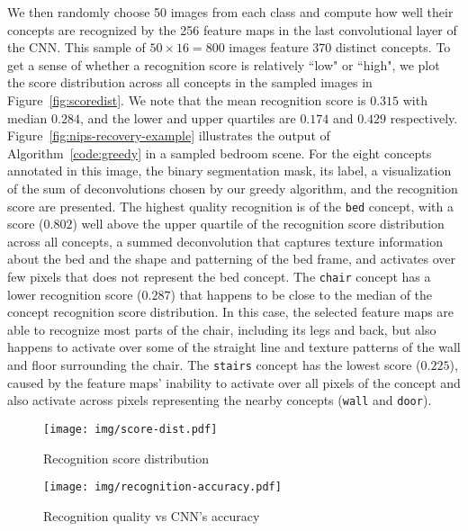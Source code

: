 \documentclass{article}
\begin{document}
We then randomly choose 50 images from each class and compute how well their concepts are recognized by the 256 feature maps in the last convolutional layer of the CNN.
This sample of $50\times16 = 800$ images feature 370 distinct concepts. 
To get a sense of whether a recognition score is relatively ``low" or ``high", we plot the score distribution across all concepts in the sampled images in Figure~\ref{fig:scoredist}. We note that the 
mean recognition score is $0.315$ with median $0.284$, and
the lower and upper quartiles are $0.174$ and $0.429$ respectively. 
Figure~\ref{fig:nips-recovery-example} illustrates the output of Algorithm~\ref{code:greedy} in a 
sampled bedroom scene. For the eight concepts annotated in this image, the binary segmentation
mask, its label, a visualization of the sum of deconvolutions chosen by our greedy algorithm, 
and the recognition score are presented. The highest quality recognition is of the \texttt{bed}
concept, with a score ($0.802$) well above the upper quartile of the recognition score distribution 
across all concepts, a summed deconvolution that captures texture information 
about the bed and the shape and patterning of the bed frame, and activates over few pixels 
that does not represent the bed concept. The \texttt{chair} concept has a lower recognition score ($0.287$)
that happens to be close to the median of the concept recognition score distribution.
In this case, the selected feature maps are able to recognize most parts of the chair, including its legs
and back, but also happens to activate over some of the straight line and texture
patterns of the wall and floor surrounding the chair. The \texttt{stairs} concept has the lowest score ($0.225$),
caused by the feature maps' inability to activate over all pixels of the concept and also activate
across pixels representing the nearby concepts (\texttt{wall} and \texttt{door}). 

\begin{figure}
\centering
\begin{minipage}{.46\textwidth}
\vspace{0px}
  \texttt{[image: img/score-dist.pdf]}
\caption{Recognition score distribution}
\label{fig:scoredist}
\end{minipage}%
\hspace{20px}
\begin{minipage}{.48\textwidth}
\texttt{[image: img/recognition-accuracy.pdf]}
\caption{Recognition quality vs CNN's accuracy}
\label{fig:recog}
\end{minipage}
\end{figure}
\end{document}
